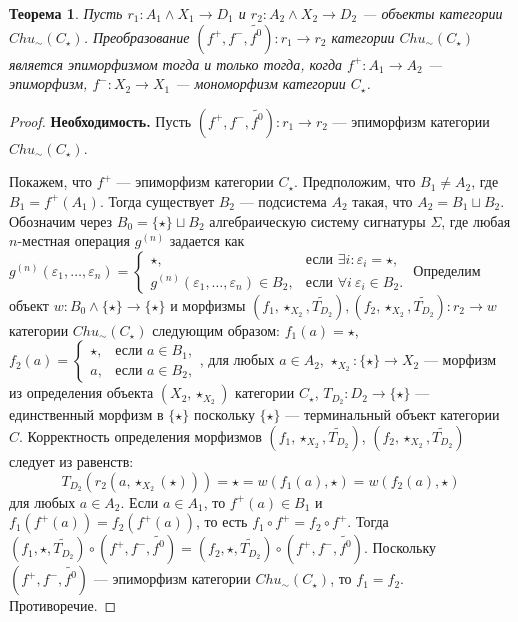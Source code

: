 \documentclass[a4paper,12pt]{article}
\newtheorem{theorem}{Теорема}
\newcommand{\fo}{\widetilde{f^0}}
\begin{document}
\begin{theorem}\label{epimorphism-c}
    Пусть $r_1: A_1 \wedge X_1 \to D_1$ и $r_2: A_2 \wedge X_2 \to D_2$ --- объекты категории $Chu_\sim(C_\star)$. Преобразование $(f^+,f^-,\fo): r_1 \to r_2$ категории $Chu_\sim(C_\star)$ является эпиморфизмом тогда и только тогда, когда $f^+: A_1 \to A_2$ --- эпиморфизм, $f^-: X_2 \to X_1$ --- мономорфизм категории $C_{\star}$.
\end{theorem}
\begin{proof}
    \textbf{Необходимость.} Пусть $(f^+,f^-,\fo): r_1 \to r_2$ --- эпиморфизм категории $Chu_\sim(C_\star)$.

    Покажем, что $f^+$ --- эпиморфизм категории $C_\star$. Предположим, что $B_1 \ne A_2$, где $B_1 = f^+(A_1)$. Тогда существует $B_2$ --- подсистема $A_2$ такая, что $A_2 = B_1 \sqcup B_2$. Обозначим через $B_0 = \{\star\} \sqcup B_2$ алгебраическую систему сигнатуры $\Sigma$, где любая $n$-местная операция $g^{(n)}$ задается как $g^{(n)}(\varepsilon_1,\ldots,\varepsilon_n) = 
    \begin{cases}
        \star, & \text{если } \exists i: \varepsilon_i = \star,\\
        g^{(n)}(\varepsilon_1,\ldots,\varepsilon_n) \in B_2, & \text{если } \forall i\ \varepsilon_i \in B_2.
    \end{cases}$ Определим объект $w: B_0 \wedge \{\star\} \to \{\star\}$ и морфизмы $(f_1,\star_{X_2},\widetilde{T_{D_2}}), (f_2,\star_{X_2},\widetilde{T_{D_2}}): r_2 \to w$ категории $Chu_\sim(C_\star)$ следующим образом: $f_1(a) = \star$, $f_2(a) = 
    \begin{cases}
        \star, & \text{если } a \in B_1,\\
        a, & \text{если } a \in B_2,
    \end{cases}$, для любых $a \in A_2$, $\star_{X_2}: \{\star\} \to X_2$ --- морфизм из определения объекта $(X_2,\star_{X_2})$ категории $C_\star$, $T_{D_2}: D_2 \to \{\star\}$ --- единственный морфизм в $\{\star\}$ поскольку $\{\star\}$ --- терминальный объект категории $C$. Корректность определения морфизмов $(f_1,\star_{X_2},\widetilde{T_{D_2}})$, $(f_2,\star_{X_2},\widetilde{T_{D_2}})$ следует из равенств:
    $$
        T_{D_2}(r_2(a,\star_{X_2}(\star))) = \star = w(f_1(a),\star) = w(f_2(a),\star)
    $$
    для любых $a \in A_2$. Если $a \in A_1$, то $f^+(a) \in B_1$ и $f_1(f^+(a)) = f_2(f^+(a))$, то есть $f_1 \circ f^+ = f_2 \circ f^+$. Тогда $(f_1,\star,\widetilde{T_{D_2}}) \circ (f^+,f^-,\fo) = (f_2,\star,\widetilde{T_{D_2}}) \circ (f^+,f^-,\fo)$. Поскольку $(f^+,f^-,\fo)$ --- эпиморфизм категории $Chu_\sim(C_\star)$, то $f_1 = f_2$. Противоречие.


\end{proof}
\end{document}
